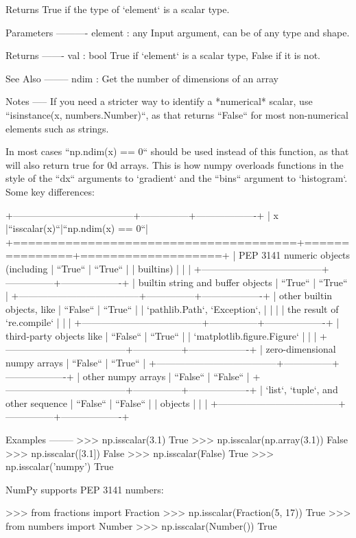 \begin{DoxyVerb}Returns True if the type of `element` is a scalar type.

Parameters
----------
element : any
    Input argument, can be of any type and shape.

Returns
-------
val : bool
    True if `element` is a scalar type, False if it is not.

See Also
--------
ndim : Get the number of dimensions of an array

Notes
-----
If you need a stricter way to identify a *numerical* scalar, use
``isinstance(x, numbers.Number)``, as that returns ``False`` for most
non-numerical elements such as strings.

In most cases ``np.ndim(x) == 0`` should be used instead of this function,
as that will also return true for 0d arrays. This is how numpy overloads
functions in the style of the ``dx`` arguments to `gradient` and the ``bins``
argument to `histogram`. Some key differences:

+--------------------------------------+---------------+-------------------+
| x                                    |``isscalar(x)``|``np.ndim(x) == 0``|
+======================================+===============+===================+
| PEP 3141 numeric objects (including  | ``True``      | ``True``          |
| builtins)                            |               |                   |
+--------------------------------------+---------------+-------------------+
| builtin string and buffer objects    | ``True``      | ``True``          |
+--------------------------------------+---------------+-------------------+
| other builtin objects, like          | ``False``     | ``True``          |
| `pathlib.Path`, `Exception`,         |               |                   |
| the result of `re.compile`           |               |                   |
+--------------------------------------+---------------+-------------------+
| third-party objects like             | ``False``     | ``True``          |
| `matplotlib.figure.Figure`           |               |                   |
+--------------------------------------+---------------+-------------------+
| zero-dimensional numpy arrays        | ``False``     | ``True``          |
+--------------------------------------+---------------+-------------------+
| other numpy arrays                   | ``False``     | ``False``         |
+--------------------------------------+---------------+-------------------+
| `list`, `tuple`, and other sequence  | ``False``     | ``False``         |
| objects                              |               |                   |
+--------------------------------------+---------------+-------------------+

Examples
--------
>>> np.isscalar(3.1)
True
>>> np.isscalar(np.array(3.1))
False
>>> np.isscalar([3.1])
False
>>> np.isscalar(False)
True
>>> np.isscalar('numpy')
True

NumPy supports PEP 3141 numbers:

>>> from fractions import Fraction
>>> np.isscalar(Fraction(5, 17))
True
>>> from numbers import Number
>>> np.isscalar(Number())
True\end{DoxyVerb}
